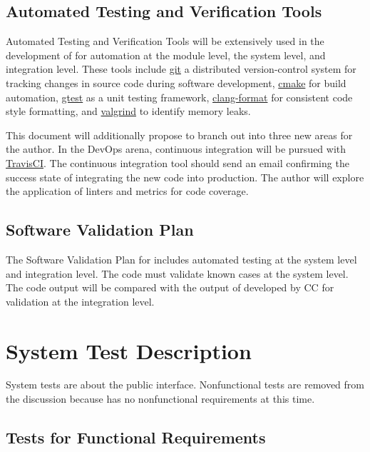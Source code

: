 \documentclass[12pt, titlepage]{article}
\begin{document}
\subsection{Automated Testing and Verification Tools}

Automated Testing and Verification Tools will be extensively used in the development of 
for automation at the module level, the system level, and integration level.
These tools include
\href{https://git.kernel.org/pub/scm/git/git.git}{git} a distributed version-control system
for tracking changes in source code during software development,
\href{https://cmake.org/}{cmake} for build automation,
\href{https://github.com/google/googletest}{gtest}
as a unit testing framework, \href{http://clang.llvm.org/docs/ClangFormat.html}{clang-format}
for consistent code style formatting, and \href{https://www.valgrind.org}{valgrind}
to identify memory leaks.

This document will additionally propose to branch out into three new areas for the author.
In the DevOps arena,
continuous integration will be pursued with \href{https://travis-ci.org}{TravisCI}.
The continuous integration tool should send an email confirming the success state
of integrating the new code into production.
The author will explore the application of linters and metrics for code coverage.

\subsection{Software Validation Plan}

The Software Validation Plan for  includes automated testing at the system level
and integration level. The code must validate known cases at the system level. The code output
will be compared with the output of \rdcon developed by CC for validation at the integration level.

\section{System Test Description}

System tests are about the public interface. Nonfunctional tests are removed from the
discussion because  has no nonfunctional requirements at this time.
	
\subsection{Tests for Functional Requirements}
\end{document}
